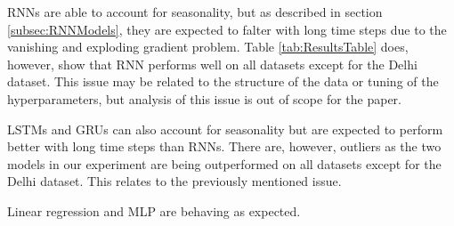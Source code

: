 RNNs are able to account for seasonality, but as described in section \ref{subsec:RNNModels}, they are expected to falter with long time steps due to the vanishing and exploding gradient problem. Table \ref{tab:ResultsTable} does, however, show that RNN performs well on all datasets except for the Delhi dataset. This issue may be related to the structure of the data or tuning of the hyperparameters, but analysis of this issue is out of scope for the paper.
 
LSTMs and GRUs can also account for seasonality but are expected to perform better with long time steps than RNNs. There are, however, outliers as the two models in our experiment are being outperformed on all datasets except for the Delhi dataset. This relates to the previously mentioned issue.

Linear regression and MLP are behaving as expected.